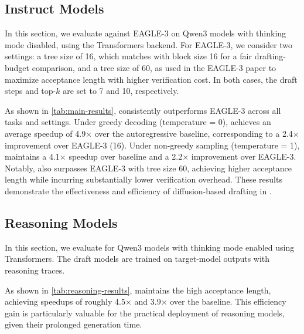 \subsection{Instruct Models}
\label{sec:exp-instruct}

In this section, we evaluate \method against EAGLE-3 on Qwen3 models with thinking mode disabled, using the Transformers backend. For EAGLE-3, we consider two settings: a tree size of 16, which matches \method with block size 16 for a fair drafting-budget comparison, and a tree size of 60, as used in the EAGLE-3 paper to maximize acceptance length with higher verification cost. In both cases, the draft steps and top-$k$ are set to 7 and 10, respectively.

As shown in \autoref{tab:main-results}, \method consistently outperforms EAGLE-3 across all tasks and settings. Under greedy decoding (temperature = 0), \method achieves an average speedup of 4.9$\times$ over the autoregressive baseline, corresponding to a 2.4$\times$ improvement over EAGLE-3 (16). Under non-greedy sampling (temperature = 1), \method maintains a 4.1$\times$ speedup over baseline and a 2.2$\times$ improvement over EAGLE-3. Notably, \method also surpasses EAGLE-3 with tree size 60, achieving higher acceptance length while incurring substantially lower verification overhead. These results demonstrate the effectiveness and efficiency of diffusion-based drafting in \method.

\subsection{Reasoning Models}
\label{sec:exp-reason}

In this section, we evaluate \method for Qwen3 models with thinking mode enabled using Transformers. The draft models are trained on target-model outputs with reasoning traces.

As shown in \autoref{tab:reasoning-results}, \method maintains the high acceptance length, achieving speedups of roughly 4.5$\times$ and 3.9$\times$ over the baseline. This efficiency gain is particularly valuable for the practical deployment of reasoning models, given their prolonged generation time.



